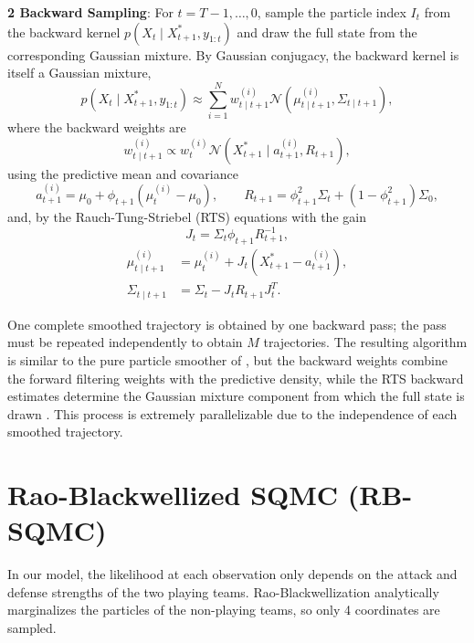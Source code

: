\textbf{2 Backward Sampling}: For $t = T-1, \dots, 0$, sample the particle index $I_t$ from the backward kernel $p(X_t \mid X_{t+1}^*, y_{1:t})$ and draw the full state from the corresponding Gaussian mixture. By Gaussian conjugacy, the backward kernel is itself a Gaussian mixture,
\begin{equation}
    p(X_t \mid X_{t+1}^*, y_{1:t}) \approx \sum_{i=1}^N w_{t \mid t+1}^{(i)} \mathcal{N}(\mu_{t \mid t+1}^{(i)}, \Sigma_{t \mid t+1}), \nonumber
\end{equation}
where the backward weights are
\begin{equation}
    w_{t \mid t+1}^{(i)} \propto w_t^{(i)} \mathcal{N}\left( X_{t+1}^* \mid a_{t+1}^{(i)}, R_{t+1} \right), \nonumber
\end{equation}
using the predictive mean and covariance
\begin{equation}
    a_{t+1}^{(i)} = \mu_0 + \phi_{t+1}(\mu_t^{(i)} - \mu_0), \qquad R_{t+1} = \phi_{t+1}^2 \Sigma_t + (1 - \phi_{t+1}^2) \Sigma_0, \nonumber
\end{equation}
and, by the Rauch-Tung-Striebel (RTS) equations with the gain
\begin{equation}
    J_t = \Sigma_t \phi_{t+1} R_{t+1}^{-1}, \nonumber
\end{equation}
\begin{align}
    \mu_{t \mid t+1}^{(i)} &= \mu_t^{(i)} + J_t \left( X_{t+1}^* - a_{t+1}^{(i)} \right), \nonumber \\
    \Sigma_{t \mid t+1} &= \Sigma_t - J_t R_{t+1} J_t^T. \nonumber
\end{align}

One complete smoothed trajectory is obtained by one backward pass; the pass must be repeated independently to obtain $M$ trajectories. The resulting algorithm is similar to the pure particle smoother of \citet{godsilldoucetwest2004montecarlosmoothing}, but the backward weights combine the forward filtering weights with the predictive density, while the RTS backward estimates determine the Gaussian mixture component from which the full state is drawn \citep{sarkkabunchgodsill2012rbpsmoother}. This process is extremely parallelizable due to the independence of each smoothed trajectory.

\section{Rao-Blackwellized SQMC (RB-SQMC)}
\label{sec:rb-sqmc}

In our model, the likelihood at each observation only depends on the attack and defense strengths of the two playing teams. Rao-Blackwellization analytically marginalizes the particles of the non-playing teams, so only 4 coordinates are sampled.

